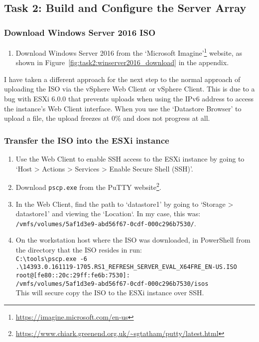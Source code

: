 \pagebreak
\subsection{Task 2: Build and Configure the Server Array}

\subsubsection{Download Windows Server 2016 ISO}
\begin{enumerate}[series=task2methodology1]
  \item Download Windows Server 2016 from the `Microsoft Imagine'\footnote{\url{https://imagine.microsoft.com/en-us}} website, as shown in Figure~\ref{fig:task2:winserver2016_download} in the  appendix.
\end{enumerate}

\noindent I have taken a different approach for the next step to the normal approach of uploading the ISO via the vSphere Web Client or vSphere Client. This is due to a bug with ESXi 6.0.0 that prevents uploads when using the IPv6 address to access the instance's Web Client interface. When you use the `Datastore Browser' to upload a file, the upload freezes at 0\% and does not progress at all.

\subsubsection{Transfer the ISO into the ESXi instance}
\begin{enumerate}[resume*=task2methodology1]
  \item Use the Web Client to enable SSH access to the ESXi instance by going to `Host > Actions > Services > Enable Secure Shell (SSH)'.
  \item Download \texttt{pscp.exe} from the PuTTY website\footnote{\url{https://www.chiark.greenend.org.uk/~sgtatham/putty/latest.html}}.
  \item In the Web Client, find the path to `datastore1' by going to `Storage > datastore1' and viewing the `Location`. In my case, this was:\\ \texttt{/vmfs/volumes/5af1d3e9-abd56f67-0cdf-000c296b7530/}.
  \item On the workstation host where the ISO was downloaded, in PowerShell from the directory that the ISO resides in run:\\
  \texttt{C:\textbackslash tools\textbackslash pscp.exe -6}\\
  \texttt{.\textbackslash 14393.0.161119-1705.RS1\_REFRESH\_SERVER\_EVAL\_X64FRE\_EN-US.ISO}\\
  \texttt{root@[fe80::20c:29ff:fe6b:7530]:}\\
  \texttt{/vmfs/volumes/5af1d3e9-abd56f67-0cdf-000c296b7530/isos}\\
  This will secure copy the ISO to the ESXi instance over SSH.
\end{enumerate}


